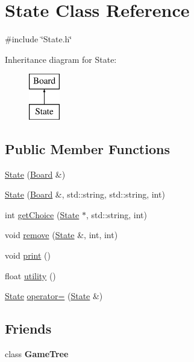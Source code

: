 \hypertarget{class_state}{\section{State Class Reference}
\label{class_state}
}


{\ttfamily \#include \char`\"{}State.\-h\char`\"{}}

Inheritance diagram for State\-:\begin{figure}[H]
\begin{center}
\leavevmode
\includegraphics[height=2.000000cm]{class_state}
\end{center}
\end{figure}
\subsection*{Public Member Functions}
\begin{DoxyCompactItemize}
\item 
\hyperlink{class_state_aebfd8b6e0c1c801bcef2160ce1a4aa7f}{State} (\hyperlink{class_board}{Board} \&)
\item 
\hyperlink{class_state_a5648beca719c17700abdf3d7e09298a1}{State} (\hyperlink{class_board}{Board} \&, std\-::string, std\-::string, int)
\item 
int \hyperlink{class_state_a12df9c21402d4f595904c91d2753e17a}{get\-Choice} (\hyperlink{class_state}{State} $\ast$, std\-::string, int)
\item 
void \hyperlink{class_state_a2cd79fa626e83ed7b9aee2cb1f111f99}{remove} (\hyperlink{class_state}{State} \&, int, int)
\item 
void \hyperlink{class_state_a70f163051bd4e35f510b232a1dbd4d16}{print} ()
\item 
float \hyperlink{class_state_a399000f09fffa8b80e3c6145bfb15c14}{utility} ()
\item 
\hyperlink{class_state}{State} \hyperlink{class_state_a25e7e4763a808d30065fc81c933e5518}{operator=} (\hyperlink{class_state}{State} \&)
\end{DoxyCompactItemize}
\subsection*{Friends}
\begin{DoxyCompactItemize}
\item 
\hypertarget{class_state_ab195efc2372da59d716bafc1ce54f7ed}{class {\bfseries Game\-Tree}}\label{class_state_ab195efc2372da59d716bafc1ce54f7ed}

\end{DoxyCompactItemize}
